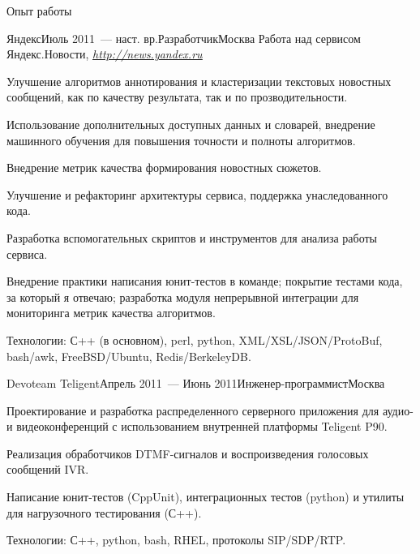 \documentclass{resume} %
\newcommand{\hreftext}[1]{\underline{\textit{#1}}}
\begin{document}
\begin{rSection}{Опыт работы}

\begin{rSubsection}{Яндекс}{Июль 2011~--- наст. вр.}{Разработчик}{Москва}
Работа над сервисом Яндекс.Новости, \href{http://news.yandex.ru}{\hreftext{http://news.yandex.ru}}
\item Улучшение алгоритмов аннотирования и кластеризации текстовых новостных сообщений, как по качеству результата, так и по прозводительности.
\item Использование дополнительных доступных данных и словарей, внедрение машинного обучения для повышения точности и полноты алгоритмов.
\item Внедрение метрик качества формирования новостных сюжетов.
\item Улучшение и рефакторинг архитектуры сервиса, поддержка унаследованного кода.
\item Разработка вспомогательных скриптов и инструментов для анализа работы сервиса.
\item Внедрение практики написания юнит-тестов в команде; покрытие тестами кода, за который я отвечаю; разработка модуля непрерывной интеграции для мониторинга метрик качества алгоритмов.
\item Технологии: С++ (в основном), perl, python, XML/XSL/JSON/ProtoBuf, bash/awk, FreeBSD/Ubuntu, Redis/BerkeleyDB.
\end{rSubsection}


\begin{rSubsection}{Devoteam Teligent}{Апрель 2011~--- Июнь 2011}{Инженер-программист}{Москва}
\item Проектирование и разработка распределенного серверного приложения для аудио- и видеоконференций 
с использованием внутренней платформы Teligent P90.
\item Реализация обработчиков DTMF-сигналов и воспроизведения голосовых сообщений IVR. 
\item Написание юнит-тестов (CppUnit), интеграционных тестов (python) и утилиты 
для нагрузочного тестирования (С++).
\item Технологии: С++, python, bash, RHEL, протоколы SIP/SDP/RTP.
\end{rSubsection}



\end{rSection}
\end{document}
